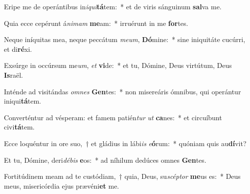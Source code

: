 \item Eripe me de operántibus in\textit{i}\textit{qui}\textbf{tá}tem:~* et de viris sánguinum \textbf{sal}va me.
\item Quia ecce cepérunt á\textit{ni}\textit{mam} \textbf{me}am:~* irruérunt in me \textbf{for}tes.
\item Neque iníquitas mea, neque peccátum \textit{me}\textit{um}, \textbf{Dó}mine:~* sine iniquitáte cucúrri, et di\textbf{ré}xi.
\item Exsúrge in occúrsum me\textit{um}, \textit{et} \textbf{vi}de:~* et tu, Dómine, Deus virtútum, Deus \textbf{Is}raël.
\item Inténde ad visitándas \textit{om}\textit{nes} \textbf{Gen}tes:~* non misereáris ómnibus, qui operántur iniqui\textbf{tá}tem.
\item Converténtur ad vésperam: et famem patién\textit{tur} \textit{ut} \textbf{ca}nes:~* et circuíbunt civi\textbf{tá}tem.
\item Ecce loquéntur in ore suo,~† et gládius in lábi\textit{is} \textit{e}\textbf{ó}rum:~* quóniam quis au\textbf{dí}vit?
\item Et tu, Dómine, deri\textit{dé}\textit{bis} \textbf{e}os:~* ad níhilum dedúces omnes \textbf{Gen}tes.
\item Fortitúdinem meam ad te custódiam,~† quia, Deus, su\textit{scép}\textit{tor} \textbf{me}us es:~* Deus meus, misericórdia ejus prævéni\textbf{et} me.
